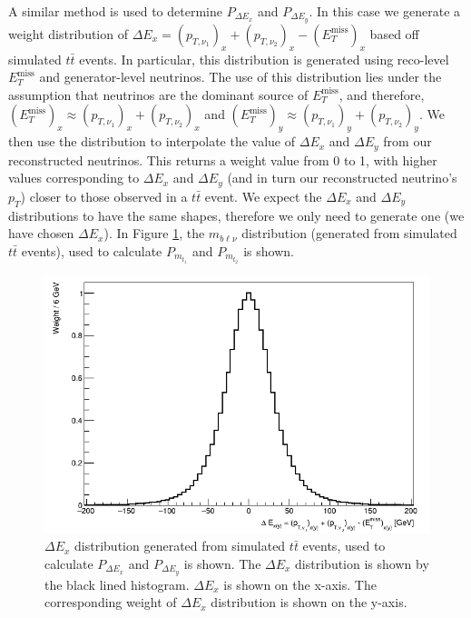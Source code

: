 A similar method is used to determine $P_{\Delta E_{x}}$ and $P_{\Delta E_{y}}$. In this case we generate a weight distribution of $\Delta E_{x} = (p_{T,\nu_{1}})_{x} + (p_{T,\nu_{2}})_{x} - (E_{T}^{\text{miss}})_{x}$ based off simulated $t\bar{t}$ events. In particular, this distribution is generated using reco-level $E_{T}^{\text{miss}}$ and generator-level neutrinos. The use of this distribution lies under the assumption that neutrinos are the dominant source of $E_{T}^{\text{miss}}$, and therefore, $(E_{T}^{\text{miss}})_{x} \approx (p_{T,\nu_{1}})_{x} + (p_{T,\nu_{2}})_{x}$ and $(E_{T}^{\text{miss}})_{y} \approx (p_{T,\nu_{1}})_{y} + (p_{T,\nu_{2}})_{y}$. We then use the distribution to interpolate the value of $\Delta E_{x}$ and $\Delta E_{y}$ from our reconstructed neutrinos. This returns a weight value from 0 to 1, with higher values corresponding to $\Delta E_{x}$ and $\Delta E_{y}$ (and in turn our reconstructed neutrino's $p_{T}$) closer to those observed in a $t\bar{t}$ event. We expect the $\Delta E_{x}$ and $\Delta E_{y}$ distributions to have the same shapes, therefore we only need to generate one (we have chosen $\Delta E_{x}$). In Figure \ref{fig:2vSM-deltaE-dist}, the $m_{b\ell\nu}$ distribution (generated from simulated $t\bar{t}$ events), used to calculate $P_{m_{t_{1}}}$ and $P_{m_{t_{2}}}$ is shown.

\begin{figure}[h!]
	\includegraphics[width=0.45\linewidth]{figures/dExy_2vSM.png}
	\centering
	\caption{$\Delta E_{x}$ distribution generated from simulated $t\bar{t}$ events, used to calculate $P_{\Delta E_{x}}$ and $P_{\Delta E_{y}}$ is shown. The $\Delta E_{x}$ distribution is shown by the black lined histogram. $\Delta E_{x}$ is shown on the x-axis. The corresponding weight of $\Delta E_{x}$ distribution is shown on the y-axis. }
	\label{fig:2vSM-deltaE-dist}
\end{figure}

